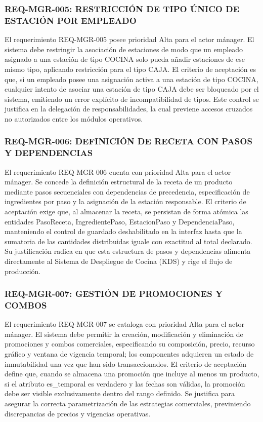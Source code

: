 \subsubsection{REQ-MGR-005: RESTRICCIÓN DE TIPO ÚNICO DE ESTACIÓN POR EMPLEADO}
El requerimiento REQ-MGR-005 posee prioridad Alta para el actor mánager. El sistema debe restringir la asociación de estaciones de modo que un empleado asignado a una estación de tipo COCINA solo pueda añadir estaciones de ese mismo tipo, aplicando restricción para el tipo CAJA. El criterio de aceptación es que, si un empleado posee una asignación activa a una estación de tipo COCINA, cualquier intento de asociar una estación de tipo CAJA debe ser bloqueado por el sistema, emitiendo un error explícito de incompatibilidad de tipos. Este control se justifica en la delegación de responsabilidades, la cual previene accesos cruzados no autorizados entre los módulos operativos. 

\subsubsection{REQ-MGR-006: DEFINICIÓN DE RECETA CON PASOS Y DEPENDENCIAS}
El requerimiento REQ-MGR-006 cuenta con prioridad Alta para el actor mánager. Se concede la definición estructural de la receta de un producto mediante pasos secuenciales con dependencias de precedencia, especificación de ingredientes por paso y la asignación de la estación responsable. El criterio de aceptación exige que, al almacenar la receta, se persistan de forma atómica las entidades PasoReceta, IngredientePaso, EstacionPaso y DependenciaPaso, manteniendo el control de guardado deshabilitado en la interfaz hasta que la sumatoria de las cantidades distribuidas iguale con exactitud al total declarado. Su justificación radica en que esta estructura de pasos y dependencias alimenta directamente al Sistema de Despliegue de Cocina (KDS) y rige el flujo de producción.

\subsubsection{REQ-MGR-007: GESTIÓN DE PROMOCIONES Y COMBOS}
El requerimiento REQ-MGR-007 se cataloga con prioridad Alta para el actor mánager. El sistema debe permitir la creación, modificación y eliminación de promociones y combos comerciales, especificando su composición, precio, recurso gráfico y ventana de vigencia temporal; los componentes adquieren un estado de inmutabilidad una vez que han sido transaccionados. El criterio de aceptación define que, cuando se almacena una promoción que incluye al menos un producto, si el atributo es\_temporal es verdadero y las fechas son válidas, la promoción debe ser visible exclusivamente dentro del rango definido. Se justifica para asegurar la correcta parametrización de las estrategias comerciales, previniendo discrepancias de precios y vigencias operativas. 

